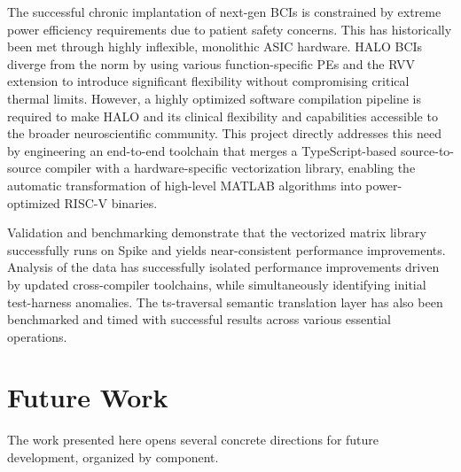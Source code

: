 

The successful chronic implantation of next-gen BCIs is constrained by extreme power efficiency requirements due to patient safety concerns. This has historically been met through highly inflexible, monolithic ASIC hardware. HALO BCIs diverge from the norm by using various function-specific PEs and the RVV extension to introduce significant flexibility without compromising critical thermal limits. However, a highly optimized software compilation pipeline is required to make HALO and its clinical flexibility and capabilities accessible to the broader neuroscientific community. This project directly addresses this need by engineering an end-to-end toolchain that merges a TypeScript-based source-to-source compiler with a hardware-specific vectorization library, enabling the automatic transformation of high-level MATLAB algorithms into power-optimized RISC-V binaries.

Validation and benchmarking demonstrate that the vectorized matrix library successfully runs on Spike and yields near-consistent performance improvements. Analysis of the data has successfully isolated performance improvements driven by updated cross-compiler toolchains, while simultaneously identifying initial test-harness anomalies. The ts-traversal semantic translation layer has also been benchmarked and timed with successful results across various essential operations.


\section{Future Work}

The work presented here opens several concrete directions for future development, organized by component.

